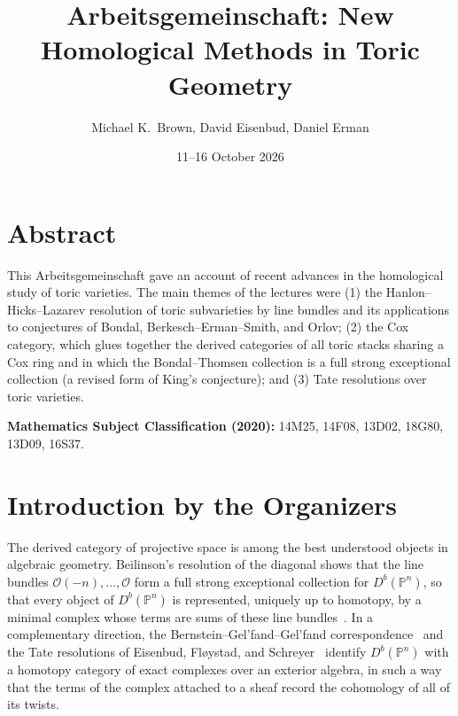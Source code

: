 \documentclass{amsart}
\newcommand{\PP}{\mathbb{P}}
\newcommand{\cO}{\mathcal{O}}
\newcommand{\Db}{D^{b}}
\begin{document}
\title{Arbeitsgemeinschaft: New Homological Methods in Toric Geometry}
\author{Michael K.\ Brown, David Eisenbud, Daniel Erman}
\date{11--16 October 2026}
\maketitle

\section*{Abstract}

This Arbeitsgemeinschaft gave an account of recent advances in the
homological study of toric varieties. The main themes of the lectures were (1) the Hanlon--Hicks--Lazarev
resolution of toric subvarieties by line bundles and its applications to conjectures of
Bondal, Berkesch--Erman--Smith, and Orlov; (2) the Cox
category, which glues together the derived categories of all toric stacks sharing a Cox
ring and in which the Bondal--Thomsen collection is a full strong exceptional collection
(a revised form of King's conjecture); and (3) Tate resolutions over toric varieties.

\medskip
\noindent\textbf{Mathematics Subject Classification (2020):}
14M25, 14F08, 13D02, 18G80, 13D09, 16S37.

\section*{Introduction by the Organizers}

The derived category of projective space is among the best understood objects in
algebraic geometry. Beilinson's resolution of the diagonal shows that the line bundles
$\cO(-n),\dots,\cO$ form a full strong exceptional collection for $\Db(\PP^n)$, so that
every object of $\Db(\PP^n)$ is represented, uniquely up to homotopy, by a minimal complex
whose terms are sums of these line bundles~\cite{Bei78}. In a complementary direction, the
Bernstein--Gel'fand--Gel'fand correspondence~\cite{BGG78} and the Tate resolutions of
Eisenbud, Fl{\o}ystad, and Schreyer~\cite{EFS03} identify $\Db(\PP^n)$ with a homotopy
category of exact complexes over an exterior algebra, in such a way that the terms of the
complex attached to a sheaf record the cohomology of all of its twists.
\end{document}
